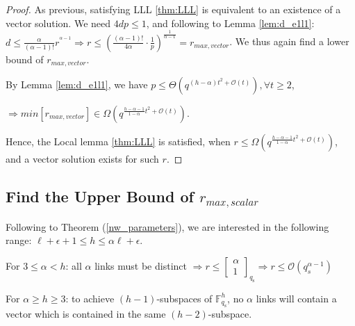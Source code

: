 \begin{proof}
As previous, satisfying LLL \ref{thm:LLL} is equivalent to an existence
of a vector solution. We need $4dp\leq1$, and following to Lemma
\ref{lem:d_e1l1}: $d\leq\frac{\alpha}{\left(\alpha-1\right)!}r^{^{\alpha-1}}\Rightarrow r\leq\left(\frac{\left(\alpha-1\right)!}{4\alpha}\cdot\frac{1}{p}\right)^{\frac{1}{\alpha-1}}=r_{max,vector}$.
We thus again find a lower bound of $r_{max,vector}$.

By Lemma \ref{lem:d_e1l1}, we have $p\leq\Theta\left(q^{\left(h-\alpha\right)t^{2}+\mathcal{O}(t)}\right),\forall t\geq2$,

$\Rightarrow min\left[r_{max,vector}\right]\in\Omega\left(q^{\frac{h-\alpha-1}{1-\alpha}t^{2}+\mathcal{O}(t)}\right)$.

Hence, the Local lemma \ref{thm:LLL} is satisfied, when $r\leq\Omega\left(q^{\frac{h-\alpha-1}{1-\alpha}t^{2}+\mathcal{O}(t)}\right)$,
and a vector solution exists for such $r$.
\end{proof}

\subsection{Find the Upper Bound of $r_{max,scalar}$}

\noindent{}

Following to Theorem (\ref{nw_parameters}), we are interested in
the following range: $\ell+\epsilon+1\leq h\leq\alpha\ell+\epsilon$.

For $3\leq\alpha<h$: all $\alpha$ links must be distinct $\Rightarrow r\leq\left[\begin{array}{c}
\alpha\\
1
\end{array}\right]_{q_{\mathrm{s}}}\Rightarrow r\leq\mathcal{O}\left(q_{s}^{\alpha-1}\right)$

For $\alpha\geq h\geq3$: to achieve $(h-1)$-subspaces of $\ensuremath{\mathbb{F}}_{q_{\mathrm{s}}}^{h}$,
no $\alpha$ links will contain a vector which is contained in the
same $(h-2)$-subspace.

